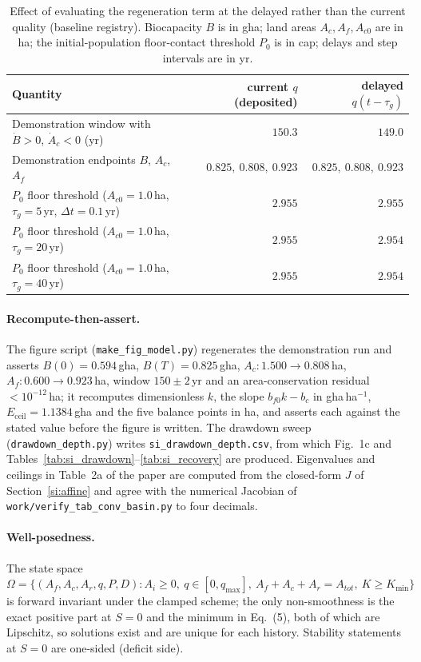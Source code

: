 \documentclass[11pt,a4paper]{article}
\newcommand{\Eceil}{E_{\mathrm{ceil}}}
\begin{document}
\begin{table}[htbp]
\centering\small
\caption{Effect of evaluating the regeneration term at the delayed rather than the current quality (baseline registry). Biocapacity $B$ is in gha; land areas $A_c,A_f,A_{c0}$ are in ha; the initial-population floor-contact threshold $P_0$ is in cap; delays and step intervals are in yr.}
\label{tab:si_delay}
\begin{tabular}{l r r}
\toprule
Quantity & current $q$ (deposited) & delayed $q(t-\tau_g)$ \\
\midrule
Demonstration window with $\dot B>0$, $\dot A_c<0$ (yr) & $150.3$ & $149.0$ \\
Demonstration endpoints $B$, $A_c$, $A_f$ & $0.825,\ 0.808,\ 0.923$ & $0.825,\ 0.808,\ 0.923$ \\
$P_0$ floor threshold ($A_{c0}=1.0$\,ha, $\tau_g=5$\,yr, $\Delta t=0.1$\,yr) & $2.955$ & $2.955$ \\
$P_0$ floor threshold ($A_{c0}=1.0$\,ha, $\tau_g=20$\,yr) & $2.955$ & $2.954$ \\
$P_0$ floor threshold ($A_{c0}=1.0$\,ha, $\tau_g=40$\,yr) & $2.955$ & $2.954$ \\
\bottomrule
\end{tabular}
\end{table}

\paragraph{Recompute-then-assert.} The figure script (\texttt{make\_fig\_model.py}) regenerates the demonstration run and asserts $B(0)=0.594$\,gha, $B(T)=0.825$\,gha, $A_c:1.500\to0.808$\,ha, $A_f:0.600\to0.923$\,ha, window $150\pm2$\,yr and an area-conservation residual $<10^{-12}$\,ha; it recomputes dimensionless $k$, the slope $b_{f0}k-b_c$ in gha\,ha$^{-1}$, $\Eceil=1.1384$\,gha and the five balance points in ha, and asserts each against the stated value before the figure is written. The drawdown sweep (\texttt{drawdown\_depth.py}) writes \texttt{si\_drawdown\_depth.csv}, from which Fig.~1c and Tables~\ref{tab:si_drawdown}--\ref{tab:si_recovery} are produced. Eigenvalues and ceilings in Table~2a of the paper are computed from the closed-form $J$ of Section~\ref{si:affine} and agree with the numerical Jacobian of \texttt{work/verify\_tab\_conv\_basin.py} to four decimals.

\paragraph{Well-posedness.} The state space $\Omega=\{(A_f,A_c,A_r,q,P,D):A_i\ge0,\ q\in[0,q_{\max}],\ A_f+A_c+A_r=A_{tot},\ K\ge K_{\min}\}$ is forward invariant under the clamped scheme; the only non-smoothness is the exact positive part at $S=0$ and the minimum in Eq.~(5), both of which are Lipschitz, so solutions exist and are unique for each history. Stability statements at $S=0$ are one-sided (deficit side).
\end{document}

